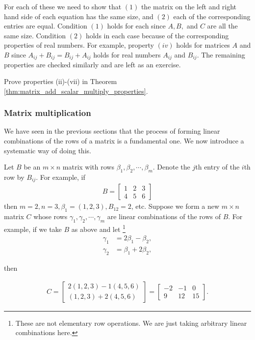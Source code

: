 \documentclass[12pt,letterpaper,reqno]{article}
\numberwithin{equation}{section}
\begin{document}
\begin{pf}
For each of these we need to show that $(1)$ the matrix on the left and right hand side of each equation has the same size, and $(2)$ each of the corresponding entries are equal. Condition $(1)$ holds for each since $A,B,$ and $C$ are all the same size. Condition $(2)$ holds in each case because of the corresponding properties of real numbers. For example, property $(iv)$ holds for matrices $A$ and $B$ since $A_{ij}+B_{ij}=B_{ij}+A_{ij}$ holds for real numbers $A_{ij}$ and $B_{ij}$. The remaining properties are checked similarly and are left as an exercise.
\end{pf}

\begin{exercise}
Prove properties (ii)-(vii) in Theorem \ref{thm:matrix_add_scalar_multiply_properties}.	
\end{exercise}

\subsubsection{Matrix multiplication}
We have seen in the previous sections that the process of forming linear combinations of the rows of a matrix is a fundamental one. We now introduce a systematic way of doing this. 

Let $B$ be an $m \times n$ matrix with rows $\beta_1,\beta_2,\cdots, \beta_m$. Denote the $j$th entry of the $i$th row by $B_{ij}$. For example, if
\begin{align*}
	B=\begin{bmatrix}
		1&2&3 \\ 4&5&6
	\end{bmatrix}
\end{align*}
then $m=2, n=3, \beta_1=(1,2,3), B_{12}=2$, etc. 
Suppose we form a new $m \times n$ matrix $C$ whose rows $\gamma_1,\gamma_2, \cdots, \gamma_m$ are linear combinations of the rows of $B$. For example, if we take $B$ as above and let \footnote{These are not elementary row operations. We are just taking arbitrary linear combinations here.}
\begin{align*}
	\gamma_1&=2\beta_1-\beta_2, \\
	\gamma_2&=\beta_1+2\beta_2,
\end{align*}

then 

\begin{align*}
	C=\begin{bmatrix}
		2(1,2,3)-1(4,5,6) \\
		(1,2,3)+2(4,5,6)
	\end{bmatrix}=\begin{bmatrix}
		-2&-1&0 \\ 9 & 12 & 15
	\end{bmatrix}.
\end{align*}
\end{document}
